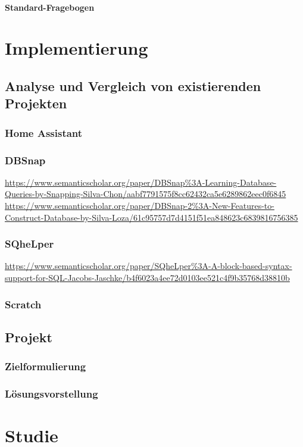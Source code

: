 \documentclass[a4paper, 12pt, oneside, BCOR=1cm,toc=chapterentrywithdots]{scrbook}
\begin{document}
\subsubsection{Standard-Fragebogen}

\chapter{Implementierung}

\section{Analyse und Vergleich von existierenden Projekten}
\subsection{Home Assistant}
\subsection{DBSnap}
\url{https://www.semanticscholar.org/paper/DBSnap\%3A-Learning-Database-Queries-by-Snapping-Silva-Chon/aabf7791575f8cc62432ca5e6289862eec0f6845}
\url{https://www.semanticscholar.org/paper/DBSnap-2\%3A-New-Features-to-Construct-Database-by-Silva-Loza/61c95757d7d4151f51ea848623c6839816756385}
\subsection{SQheLper}
\url{https://www.semanticscholar.org/paper/SQheLper\%3A-A-block-based-syntax-support-for-SQL-Jacobs-Jaschke/b4f6023a4ee72d0103ee521c4f9b35768d38810b}
\subsection{Scratch}

\section{Projekt}
\subsection{Zielformulierung}
\subsection{Lösungsvorstellung}

\chapter{Studie}
\end{document}

